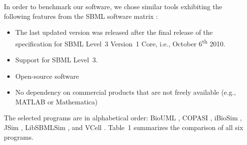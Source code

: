 \documentclass[10pt]{bmc_article}
\newenvironment{bmcformat}{\fussy\setboolean{publ}{true}}{\fussy}
\begin{document}
\begin{bmcformat}
In order to benchmark our software, we chose similar tools exhibiting the
following features from the \acs{SBML} software
matrix :
%
%
\begin{itemize}
  \item The last updated version was released after the final release of
  the specification for \acs{SBML} Level~3 Version~1 Core, i.e., October
  6\textsuperscript{th} 2010.
  \item Support for \acs{SBML} Level~3.
  \item Open-source software
  \item No dependency on commercial products that are not freely available
  (e.g., MATLAB\texttrademark{} or Mathematica\texttrademark)
\end{itemize}
The selected programs are in alphabetical order:
BioUML \cite{Kolpakov2011}, COPASI \cite{Hoops2006}, 
iBioSim \cite{Myers2009}, JSim \cite{Raymond2003}, LibSBMLSim 
\cite{Takizawa2013}, and VCell \cite{Moraru2008}.
Table~1 summarizes the comparison of  all six
programs.



\end{bmcformat}
\end{document}

